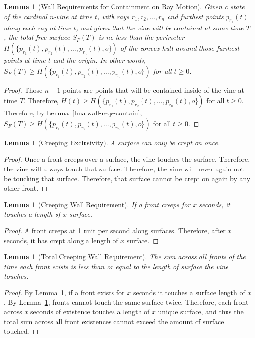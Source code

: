 \documentclass[12pt]{article}
\theoremstyle{plain}
\newtheorem{lemma}[theorem]{Lemma}
\theoremstyle{definition}
\begin{document}
\begin{lemma}[Wall Requirements for Containment on Ray Motion]
\label{lma:wall-reqs-ray-motion}
Given a state of the cardinal \(n\)-vine at time \(t\), with rays \(r_1,r_2,\dots,r_n\) and furthest points \(p_{r_1}(t)\) along each ray at time \(t\), and given that the vine will be contained at some time \(T\), the total free surface \(S_F(T)\) is no less than the perimeter \(H(\{p_{r_1}(t),p_{r_2}(t),\dots,p_{r_n}(t), o\})\) of the convex hull  around those furthest points at time \(t\) and the origin. In other words, \(S_F(T)\geq H(\{p_{r_1}(t),p_{r_2}(t),\dots,p_{r_n}(t), o\})\) for all \(t\geq 0\). 
\end{lemma}
\begin{proof}[Proof]
Those \(n+1\) points are points that will be contained inside of the vine at time \(T\). Therefore,  \(H(t)\geq H(\{p_{r_1}(t),p_{r_2}(t),\dots,p_{r_n}(t), o\})\) for all \(t\geq 0\). Therefore, by Lemma~\ref{lma:wall-reqs-contain},  \(S_F(T)\geq H(\{p_{r_1}(t),p_{r_2}(t),\dots,p_{r_n}(t), o\})\) for all \(t\geq 0\). 
\end{proof}


\begin{lemma}[Creeping Exclusivity]
\label{lma:creeping-exclusive}
A surface can only be crept on once. 
\end{lemma}
\begin{proof}[Proof]
Once a front creeps over a surface, the vine touches the surface. Therefore, the vine will always touch that surface. Therefore, the vine will never again not be touching that surface. Therefore, that surface cannot be crept on again by any other front. 
\end{proof}



\begin{lemma}[Creeping Wall Requirement]
\label{lma:creeping-wall}
If a front creeps for \(x\) seconds, it touches a length of \(x\) surface. 
\end{lemma}
\begin{proof}[Proof]
A front creeps at 1 unit per second along surfaces. Therefore, after \(x\) seconds, it has crept along a length of \(x\) surface.  
\end{proof}



\begin{lemma}[Total Creeping Wall Requirement]
\label{lma:total-creeping}
The sum across all fronts of the time each front exists is less than or equal to the length of surface the vine touches. 
\end{lemma}
\begin{proof}[Proof]
By Lemma~\ref{lma:creeping-wall}, if a front exists for \(x\) seconds it touches a surface length of \(x\). By Lemma~\ref{lma:creeping-exclusive}, fronts cannot touch the same surface twice. Therefore, each front across \(x\) seconds of existence touches a length of \(x\) unique surface, and thus the total sum across all front existences cannot exceed the amount of surface touched. 
\end{proof}
\end{document}
